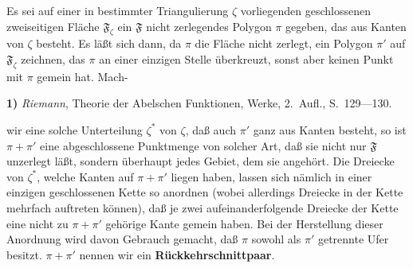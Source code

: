 \documentclass{article}
\begin{document}
Es sei auf einer in bestimmter Triangulierung $\zeta$ vorliegenden geschlossenen zweiseitigen Fläche $\mathfrak{F}_\zeta$ ein $\mathfrak{F}$ nicht zerlegendes Polygon $\pi$ gegeben, das aus Kanten von $\zeta$ besteht. Es läßt sich dann, da $\pi$ die Fläche nicht zerlegt, ein Polygon $\pi'$ auf $\mathfrak{F}_\zeta$ zeichnen, das $\pi$ an einer einzigen Stelle überkreuzt, sonst aber keinen Punkt mit $\pi$ gemein hat. Mach-

\textbf{1)} \emph{Riemann}, Theorie der Abelschen Funktionen, Werke, 2.~Aufl., S.~129---130.

wir eine solche Unterteilung $\zeta^*$ von $\zeta$, daß auch $\pi'$ ganz aus Kanten besteht, so ist $\pi + \pi'$ eine abgeschlossene Punktmenge von solcher Art, daß sie nicht nur $\mathfrak{F}$ unzerlegt läßt, sondern überhaupt jedes Gebiet, dem sie angehört. Die Dreiecke von $\zeta^*$, welche Kanten auf $\pi + \pi'$ liegen haben, lassen sich nämlich in einer einzigen geschlossenen Kette so anordnen (wobei allerdings Dreiecke in der Kette mehrfach auftreten können), daß je zwei aufeinanderfolgende Dreiecke der Kette eine nicht zu $\pi + \pi'$ gehörige Kante gemein haben. Bei der Herstellung dieser Anordnung wird davon Gebrauch gemacht, daß $\pi$ sowohl als $\pi'$ getrennte Ufer besitzt. $\pi + \pi'$ nennen wir ein \textbf{Rückkehrschnittpaar}.

\end{document}
